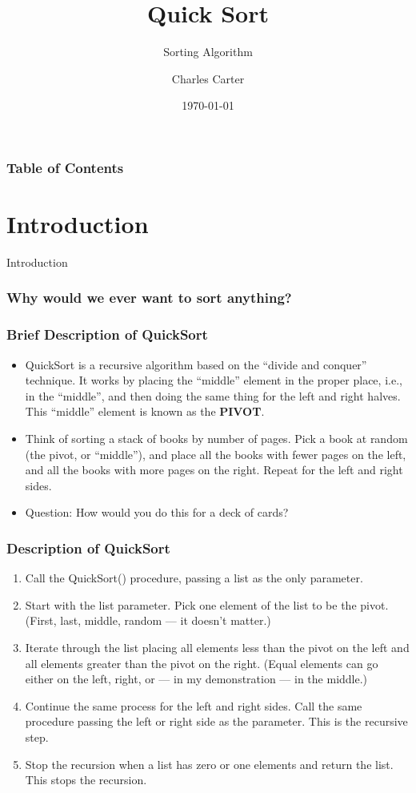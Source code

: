 \documentclass{beamer}
\title{Quick Sort}
\subtitle{Sorting Algorithm}
\author{Charles Carter}
\institute{Auburn University}
\date{\today}
\begin{document}
\frame{\titlepage}

\begin{frame}
\frametitle{Table of Contents}
\tableofcontents
\end{frame}

\section{Introduction}
\begin{frame}
    \LARGE Introduction
\end{frame}

    \begin{frame}
        \frametitle{Why would we ever want to sort anything?}

    \end{frame}

    \begin{frame}
        \frametitle{Brief Description of QuickSort}
        \begin{itemize}
            \item QuickSort is a recursive algorithm based on the ``divide and conquer'' technique. It works by placing the ``middle'' element in the proper place, i.e., in the ``middle'', and then doing the same thing for the left and right halves. This ``middle'' element is known as the \textbf{PIVOT}.
            \item Think of sorting a stack of books by number of pages. Pick a book at random (the pivot, or ``middle''), and place all the books with fewer pages on the left, and all the books with more pages on the right. Repeat for the left and right sides.
            \item Question: How would you do this for a deck of cards?
        \end{itemize}
    \end{frame}

    \begin{frame}
        \frametitle{Description of QuickSort}
        \begin{enumerate}
            \item Call the QuickSort() procedure, passing a list as the only parameter.
            \item Start with the list parameter. Pick one element of the list to be the pivot. (First, last, middle, random --- it doesn't matter.)
            \item Iterate through the list placing all elements less than the pivot on the left and all elements greater than the pivot on the right. (Equal elements can go either on the left, right, or --- in my demonstration --- in the middle.)
            \item Continue the same process for the left and right sides. Call the same procedure passing the left or right side as the parameter. This is the recursive step.
            \item Stop the recursion when a list has zero or one elements and return the list. This stops the recursion.
        \end{enumerate}
    \end{frame}
\end{document}
